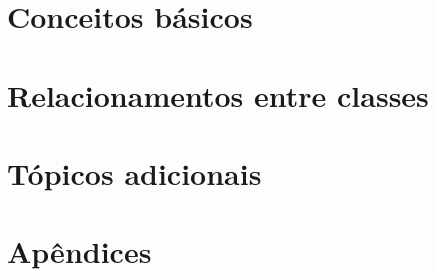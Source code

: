 \newcommand{\defs}{../defs}


\newcommand{\myname}{Prof. Marcelo de Souza}
\newcommand{\university}{Universidade do Estado de Santa Catarina}
\newcommand{\campus}{Centro de Educação Superior do Alto Vale do Itajaí}
\newcommand{\mytitle}{Programação Orientada a Objetos\\Notas de Aula}
\newcommand{\version}{Versão compilada em \today.}
\newcommand{\exercisedescription}{Exercício}

\newcommand{\presentation}{Este material é utilizado em parte das aulas da disciplina de Programação I (25PRO1) do curso de Bacharelado em Engenharia de Software da Universidade do Estado de Santa Catarina (UDESC Ibirama).\\ \\
\textbf{Contato:} \texttt{marcelo.desouza@udesc.br}}

\newcommand{\license}{\small Esta obra está disponível sob uma Licença \href{https://creativecommons.org/licenses/by-nc-nd/4.0}{Creative Commons (BY-NC-ND 4.0 Internacional)}.}

\newcommand{\logo}{
\begin{figure}[h]
	\centering
	\texttt{[image: \\defs/img/logo-udesc.png]}
\end{figure}
}



\maketitle
\tableofcontents

\part{Conceitos básicos}



\part{Relacionamentos entre classes}








\part{Tópicos adicionais}



\part{Apêndices}
\appendix


\nocite{*}



